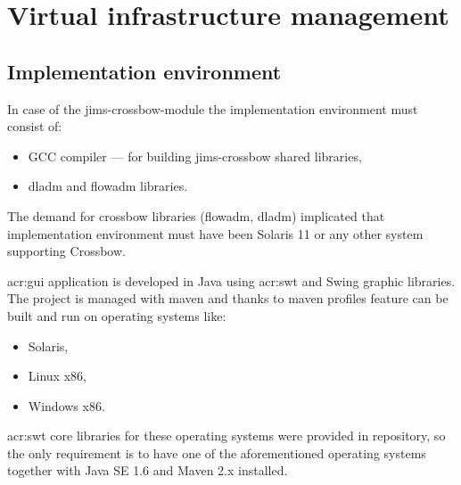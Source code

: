 \documentclass[11pt,openany]{book}
\begin{document}
        \noindent
          \begin{minipage}{\textwidth}
          
        \end{minipage}  

        \noindent
        \begin{minipage}{\textwidth}
          
        \end{minipage}


    \section{Virtual infrastructure management}

      \subsection{Implementation environment}

        In case of the jims-crossbow-module the implementation environment must consist of:

        \begin{itemize}
          \item GCC compiler --- for building jims-crossbow shared libraries,
          \item dladm and flowadm libraries.
        \end{itemize}
	
        The demand for crossbow libraries (flowadm, dladm) implicated that implementation environment must have been
        Solaris 11 or any other system supporting Crossbow.

        \gls{acr:gui} application is developed in Java using \gls{acr:swt} and Swing graphic libraries. The project is
        managed with maven and thanks to maven profiles feature can be built and run on operating systems like:

        \begin{itemize}
          \item Solaris,
          \item Linux x86,
          \item Windows x86.
        \end{itemize}

        \gls{acr:swt} core libraries for these operating systems were provided in repository, so the only requirement is
        to have one of the aforementioned operating systems together with Java SE 1.6 and Maven 2.x installed.
\end{document}
